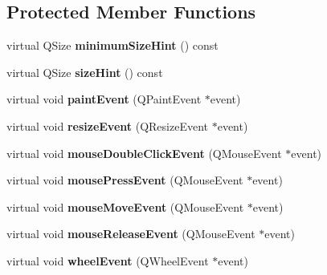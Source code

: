 \subsection*{Protected Member Functions}
\begin{DoxyCompactItemize}
\item 
\mbox{\label{class_q_custom_plot_a0f7d90553493be687da80544f7244ad2}} 
virtual Q\+Size {\bfseries minimum\+Size\+Hint} () const
\item 
\mbox{\label{class_q_custom_plot_a51601831bc7d5403d5e729347a10ba33}} 
virtual Q\+Size {\bfseries size\+Hint} () const
\item 
\mbox{\label{class_q_custom_plot_a2bbc3b1c24bfcc8a7cc1f3008cdd9b73}} 
virtual void {\bfseries paint\+Event} (Q\+Paint\+Event $\ast$event)
\item 
\mbox{\label{class_q_custom_plot_a13e05523a40c3f08875df5cde85cf0d9}} 
virtual void {\bfseries resize\+Event} (Q\+Resize\+Event $\ast$event)
\item 
\mbox{\label{class_q_custom_plot_a77591913a5b543bdc465dd5e08325a49}} 
virtual void {\bfseries mouse\+Double\+Click\+Event} (Q\+Mouse\+Event $\ast$event)
\item 
\mbox{\label{class_q_custom_plot_abce84fa2c71e47b9295d67e8fce84bb4}} 
virtual void {\bfseries mouse\+Press\+Event} (Q\+Mouse\+Event $\ast$event)
\item 
\mbox{\label{class_q_custom_plot_ac64727a4f442770f6e5e6be2d0530843}} 
virtual void {\bfseries mouse\+Move\+Event} (Q\+Mouse\+Event $\ast$event)
\item 
\mbox{\label{class_q_custom_plot_a724e97d2e8c03e68adac5f4b6164a1b3}} 
virtual void {\bfseries mouse\+Release\+Event} (Q\+Mouse\+Event $\ast$event)
\item 
\mbox{\label{class_q_custom_plot_a7b8bd7e8d3a1d23a8595e9c6a6b76ef1}} 
virtual void {\bfseries wheel\+Event} (Q\+Wheel\+Event $\ast$event)
\item 
\mbox{\label{class_q_custom_plot_ad7a7d878bf050f101a43008e7d8fdb52}} 

\end{DoxyCompactItemize}
